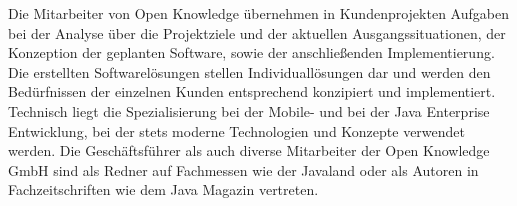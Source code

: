 Die Mitarbeiter von Open Knowledge übernehmen in Kundenprojekten Aufgaben bei der Analyse über die Projektziele und der aktuellen Ausgangssituationen, der Konzeption der geplanten Software, sowie der anschließenden Implementierung. Die erstellten Softwarelösungen stellen Individuallösungen dar und werden den Bedürfnissen der einzelnen Kunden entsprechend konzipiert und implementiert. Technisch liegt die Spezialisierung bei der Mobile- und bei der Java Enterprise Entwicklung, bei der stets moderne Technologien und Konzepte verwendet werden. Die Geschäftsführer als auch diverse Mitarbeiter der Open Knowledge GmbH sind als Redner auf Fachmessen wie der Javaland oder als Autoren in Fachzeitschriften wie dem Java Magazin vertreten.

\pagebreak
